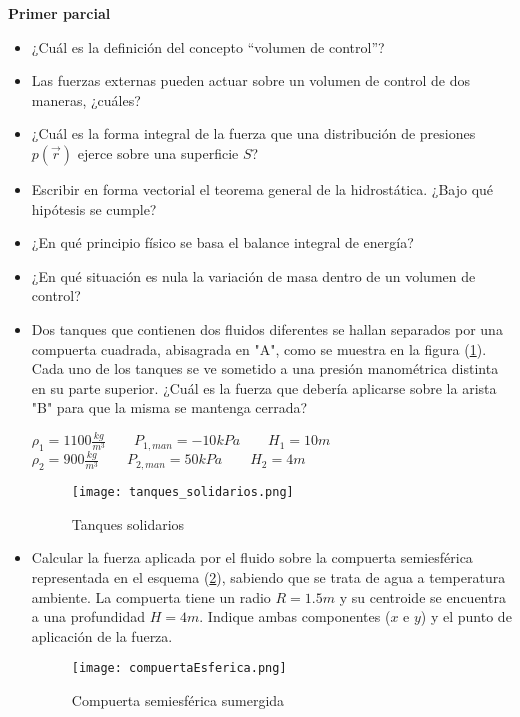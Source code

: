 \textbf{Primer parcial}
\begin{itemize}
\item ¿Cuál es la definición del concepto ``volumen de control''?
\item Las fuerzas externas pueden actuar sobre un volumen de control de dos maneras, ¿cuáles?
\item ¿Cuál es la forma integral de la fuerza que una distribución de presiones $p(\vec{r})$ ejerce sobre una superficie $S$?
\item Escribir en forma vectorial el teorema general de la hidrostática. ¿Bajo qué hipótesis se cumple?
\item ¿En qué principio físico se basa el balance integral de energía?
\item ¿En qué situación es nula la variación de masa dentro de un volumen de control?
\item Dos tanques que contienen dos fluidos diferentes se hallan separados por
una compuerta cuadrada, abisagrada en "A", como se muestra en la figura (\ref{fig:tanques}).
Cada uno de los tanques se ve sometido a una presión manométrica distinta en su
parte superior. ¿Cuál es la fuerza que debería aplicarse sobre la arista "B" para que la misma se mantenga cerrada?
\begin{center}
  $\rho_1 = 1100 \frac{kg}{m^3} \qquad P_{1,man} = -10 kPa \qquad H_1 = 10 m $\\
  $\rho_2 = 900 \frac{kg}{m^3} \qquad P_{2,man} = 50 kPa \qquad H_2 = 4 m$
\end{center}
\begin{figure}[h!!!!]
  \centering
  \texttt{[image: tanques\_solidarios.png]}
  \caption{Tanques solidarios}
  \label{fig:tanques}
\end{figure}
\item Calcular la fuerza aplicada por el fluido sobre la compuerta semiesférica representada en el esquema (\ref{fig:esfera}), sabiendo que se trata de agua a temperatura ambiente. La compuerta tiene un radio $R=1.5m$ y su  centroide se encuentra a una profundidad $H=4m$. Indique ambas componentes ($x$ e $y$) y el punto de aplicación de la fuerza.
  \begin{figure}[!!h]
    \centering
    \texttt{[image: compuertaEsferica.png]}
    \label{fig:esfera}
    \caption{Compuerta semiesférica sumergida}
  \end{figure}


\end{itemize}
